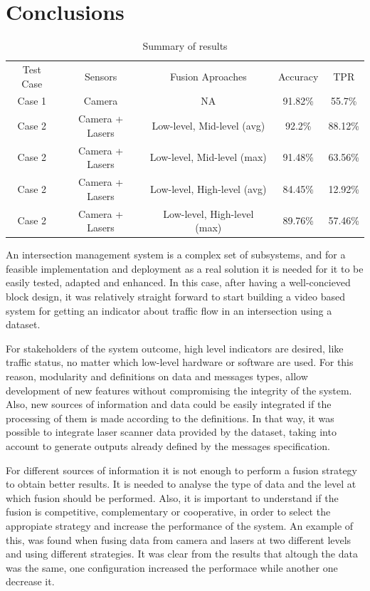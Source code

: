 \section{Conclusions}


\begin{table}[ht!]
\footnotesize
\begin{tabular}{c c c c c}
Test Case & Sensors & Fusion Aproaches & Accuracy & TPR \\

Case 1 & Camera & NA & 91.82\% & 55.7\% \\
Case 2 & Camera + Lasers & Low-level, Mid-level (avg) & 92.2\% & 88.12\%\\
Case 2 & Camera + Lasers & Low-level, Mid-level (max) & 91.48\% & 63.56\% \\
Case 2 & Camera + Lasers & Low-level, High-level (avg) & 84.45\% & 12.92\% \\
Case 2 & Camera + Lasers & Low-level, High-level (max) & 89.76\% & 57.46\%\\

\end{tabular}
\caption{Summary of results}
\label{results}
\end{table}

An intersection management system is a complex set of subsystems, and for a feasible implementation and deployment as a real solution it is needed for it to be easily tested, adapted and enhanced. In this case, after having a well-concieved block design, it was relatively straight forward to start building a video based system for getting an indicator about traffic flow in an intersection using a dataset.

For stakeholders of the system outcome, high level indicators are desired, like traffic status, no matter which low-level hardware or software are used. For this reason, modularity and definitions on data and messages types, allow development of new features without compromising the integrity of the system. Also, new sources of information and data could be easily integrated if the processing of them is made according to the definitions. In that way, it was possible to integrate laser scanner data provided by the dataset, taking into account to generate outputs already defined by the messages specification.

For different sources of information it is not enough to perform a fusion strategy to obtain better results. It is needed to analyse the type of data and the level at which fusion should be performed. Also, it is important to understand if the fusion is competitive, complementary or cooperative, in order to select the appropiate strategy and increase the performance of the system. An example of this, was found when fusing data from camera and lasers at two different levels and using different strategies. It was clear from the results that altough the data was the same, one configuration increased the performace while another one decrease it.





